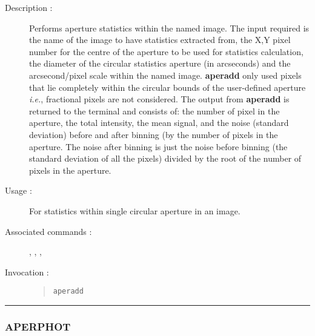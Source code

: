 \begin{description}

\item[Description :] Performs aperture statistics within the named
image. The input required is the name of the image to have statistics
extracted from, the X,Y pixel number for the centre of the aperture to
be used for statistics calculation, the diameter of the circular
statistics aperture (in arcseconds) and the arcsecond/pixel scale
within the named image. {\bf aperadd} only used pixels that lie completely
within the circular bounds of the user-defined aperture \emph{i.e.},
fractional pixels are not considered. The output from {\bf aperadd} is
returned to the terminal and consists of: the number of pixel in the
aperture, the total intensity, the mean signal, and the noise (standard
deviation) before and after binning (by the number of pixels in the
aperture.  The noise after binning is just the noise before binning
(the standard deviation of all the pixels) divided by the root of the
number of pixels in the aperture.

\item[Usage :] For statistics within single circular aperture in
an image.

\item[Associated commands :] {\tt {}},
{\tt {}}, {\tt {}},
{\tt {}}

\item[Invocation :]

\begin{quote}{\tt  aperadd }\end{quote}

\end{description}

\hrule
\subsubsection*{\label{APERPHOT}APERPHOT}


